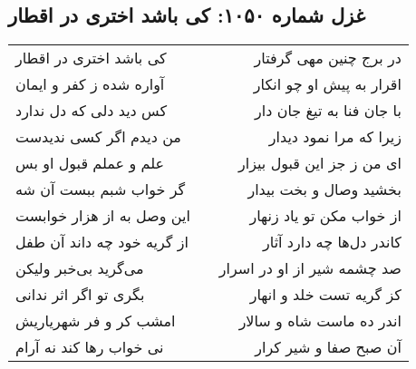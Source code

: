 \begin{center}
\section*{غزل شماره ۱۰۵۰: کی باشد اختری در اقطار}
\label{sec:1050}
\begin{longtable}{l p{0.5cm} r}
کی باشد اختری در اقطار
&&
در برج چنین مهی گرفتار
\\
آواره شده ز کفر و ایمان
&&
اقرار به پیش او چو انکار
\\
کس دید دلی که دل ندارد
&&
با جان فنا به تیغ جان دار
\\
من دیدم اگر کسی ندیدست
&&
زیرا که مرا نمود دیدار
\\
علم و عملم قبول او بس
&&
ای من ز جز این قبول بیزار
\\
گر خواب شبم ببست آن شه
&&
بخشید وصال و بخت بیدار
\\
این وصل به از هزار خوابست
&&
از خواب مکن تو یاد زنهار
\\
از گریه خود چه داند آن طفل
&&
کاندر دل‌ها چه دارد آثار
\\
می‌گرید بی‌خبر ولیکن
&&
صد چشمه شیر از او در اسرار
\\
بگری تو اگر اثر ندانی
&&
کز گریه تست خلد و انهار
\\
امشب کر و فر شهریاریش
&&
اندر ده ماست شاه و سالار
\\
نی خواب رها کند نه آرام
&&
آن صبح صفا و شیر کرار
\\
\end{longtable}
\end{center}
